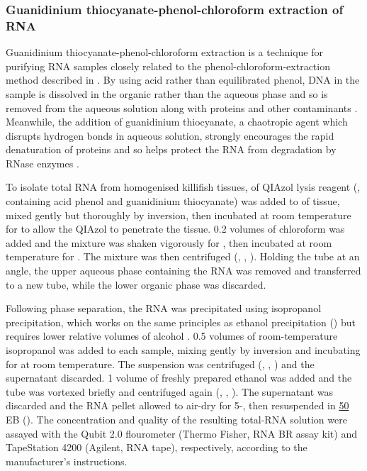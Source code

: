 \subsubsection{Guanidinium thiocyanate-phenol-chloroform extraction of RNA}
\label{sec:methods_molec_standard_qiazol}

Guanidinium thiocyanate-phenol-chloroform extraction is a technique for purifying RNA samples closely related to the phenol-chloroform-extraction method described in  \parencite{zumbo2012phenolchloroform}. By using acid rather than equilibrated phenol, DNA in the sample is dissolved in the organic rather than the aqueous phase and so is removed from the aqueous solution along with proteins and other contaminants \parencite{zumbo2012phenolchloroform,chomczynski2006trizol}. Meanwhile, the addition of guanidinium thiocyanate, a chaotropic agent which disrupts hydrogen bonds in aqueous solution, strongly encourages the rapid denaturation of proteins and so helps protect the RNA from degradation by RNase enzymes \parencite{zumbo2012phenolchloroform,chomczynski2006trizol}.

To isolate total RNA from homogenised killifish tissues,  of QIAzol lysis reagent (, containing acid phenol and guanidinium thiocyanate) was added to  of tissue, mixed gently but thoroughly by inversion, then incubated at room temperature for  to allow the QIAzol to penetrate the tissue. 0.2 volumes of chloroform was added and the mixture was shaken vigorously for , then incubated at room temperature for . The mixture was then centrifuged (, , ). Holding the tube at an angle, the upper aqueous phase containing the RNA was removed and transferred to a new tube, while the lower organic phase was discarded.

Following phase separation, the RNA was precipitated using isopropanol precipitation, which works on the same principles as ethanol precipitation () but requires lower relative volumes of alcohol \parencite{zumbo2012ethanol}. 0.5 volumes of room-temperature isopropanol was added to each sample, mixing gently by inversion and incubating for  at room temperature. The suspension was centrifuged (, , ) and the supernatant discarded. 1 volume of freshly prepared  ethanol was added and the tube was vortexed briefly and centrifuged again (, , ). The supernatant was discarded and the RNA pellet allowed to air-dry for 5-, then resuspended in \ul{50} EB (). The concentration and quality of the resulting total-RNA solution were assayed with the Qubit 2.0 flourometer (Thermo Fisher, RNA BR assay kit) and TapeStation 4200 (Agilent, RNA tape), respectively, according to the manufacturer's instructions.

